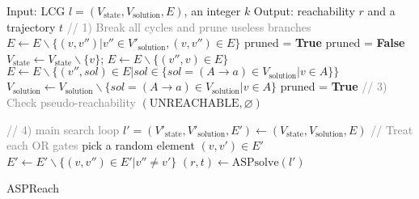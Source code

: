 \documentclass{entcs}
\begin{document}
\begin{algorithm}[htb]
\begin{algorithmic}[1]
\State Input: LCG $l=(V_{\mathrm{state}},V_{\mathrm{solution}}, E)$, an integer $k$
\State Output: reachability $r$ and a trajectory $t$
\State \textcolor{gray}{// 1) Break all cycles and prune useless branches}\label{delete_cycle_begin}
        \State $E\gets E\backslash \{(v,v'')|v''\in V'_{\mathrm{solution}},(v,v'')\in E\}$
    \EndIf
\EndFor
\EndFor \label{delete_cycle_end}
\State{\textcolor{gray}{// 2) remove useless nodes/edges}} \label{prune_begin}
\State pruned = \textbf{True}
    \State pruned = \textbf{False}
            \State $V_{\mathrm{state}} \gets V_{\mathrm{state}}\backslash \{v\}$; $E\gets E\backslash \{ (v'',v)\in E\}$
            \State $E\gets E\backslash \{ (v'',sol)\in E | sol \in \{sol = (A \rightarrow a) \in V_{\mathrm{solution}} | v \in A\}\}$
            \State $V_{\mathrm{solution}} \gets V_{\mathrm{solution}}\backslash \{sol = (A \rightarrow a) \in V_{\mathrm{solution}} | v \in A\}$
            \State pruned = \textbf{True}
        \EndIf
    \EndFor \label{prune_end}
\EndWhile
\State \textcolor{gray}{// 3) Check pseudo-reachability} \label{pseudo_reach_begin}
    \State \Return $(\mathrm{UNREACHABLE},\varnothing)$
\EndIf \label{pseudo_reach_end}

\State \textcolor{gray}{// 4) main search loop} \label{main_loop_begin}
    \State $l'=(V'_{\mathrm{state}}, V'_{\mathrm{solution}},E')\gets(V_{\mathrm{state}}, V_{\mathrm{solution}},E)$
     \textcolor{gray}{// Treat each OR gates}
        \State pick a random element $(v,v') \in E'$
        \State $E'\gets E' \backslash  \{(v,v'') \in E'| v''\neq v'\}$
    \EndFor
    \State $(r,t)\gets\mathrm{ASPsolve}(l')$
    \EndIf
\EndFor \label{main_loop_end}
\State {}
\end{algorithmic}
\caption{ASPReach}\label{algOverall}
\end{algorithm}
\end{document}
